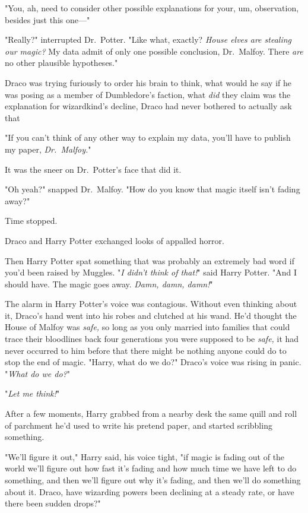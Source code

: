"You, ah, need to consider other possible explanations for your, um,
observation, besides just this one\mbox{---}"

"Really?" interrupted Dr.~Potter. "Like what, exactly? \emph{House elves are
stealing our magic?} My data admit of only one possible conclusion, Dr.~Malfoy.
There \emph{are} no other plausible hypotheses."

Draco was trying furiously to order his brain to think, what would he say if he
was posing as a member of Dumbledore's faction, what \emph{did} they claim was
the explanation for wizardkind's decline, Draco had never bothered to actually
ask that{\el}

"If you can't think of any other way to explain my data, you'll have to publish
my paper, \emph{Dr.~Malfoy.}"

It was the sneer on Dr.~Potter's face that did it.

"Oh yeah?" snapped Dr.~Malfoy. "How do you know that magic itself isn't fading
away?"

Time stopped.

Draco and Harry Potter exchanged looks of appalled horror.

Then Harry Potter spat something that was probably an extremely bad word if
you'd been raised by Muggles. "\emph{I didn't think of that!}" said Harry
Potter. "And I should have. The magic goes away. \emph{Damn, damn, damn!}"

The alarm in Harry Potter's voice was contagious. Without even thinking about
it, Draco's hand went into his robes and clutched at his wand. He'd thought the
House of Malfoy was \emph{safe,} so long as you only married into families that
could trace their bloodlines back four generations you were supposed to be
\emph{safe,} it had never occurred to him before that there might be nothing
anyone could do to stop the end of magic. "Harry, what do we do?" Draco's voice
was rising in panic. "\emph{What do we do?}"

"\emph{Let me think!}"

After a few moments, Harry grabbed from a nearby desk the same quill and roll
of parchment he'd used to write his pretend paper, and started scribbling
something.

"We'll figure it out," Harry said, his voice tight, "if magic is fading out of
the world we'll figure out how fast it's fading and how much time we have left
to do something, and then we'll figure out why it's fading, and then we'll do
something about it. Draco, have wizarding powers been declining at a steady
rate, or have there been sudden drops?"

